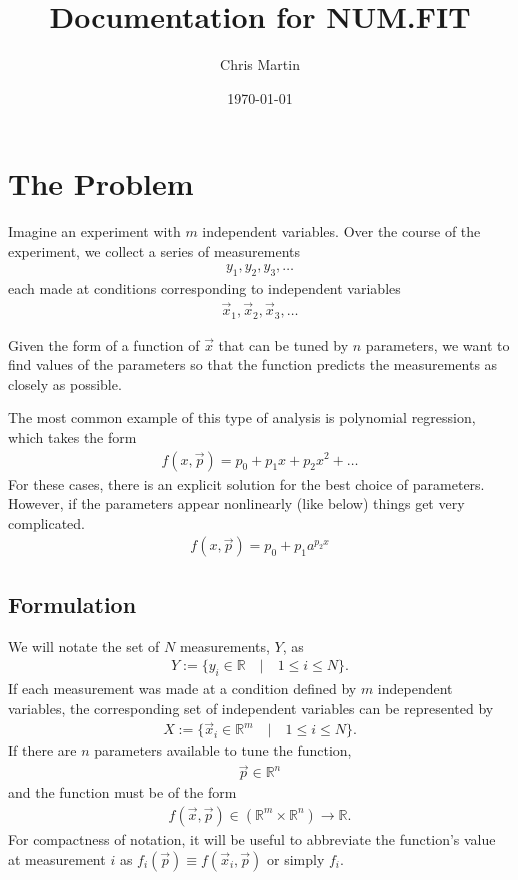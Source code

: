 \documentclass{article}
\title{Documentation for NUM.FIT}
\author{Chris Martin}
\date{\today}
\def\x{\vec{x}}
\def\p{\vec{p}}
\def\R{\mathbb{R}}
\begin{document}
\maketitle

\section{The Problem}
Imagine an experiment with $m$ independent variables.  Over the course of the experiment, we collect a series of measurements
\begin{align}
y_1, y_2, y_3, \ldots\nonumber
\end{align}
each made at conditions corresponding to independent variables
\begin{align}
\x_1, \x_2, \x_3, \ldots\nonumber
\end{align}

Given the form of a function of $\x$ that can be tuned by $n$ parameters, we want to find values of the parameters so that the function predicts the measurements as closely as possible.

The most common example of this type of analysis is polynomial regression, which takes the form
\begin{align}
f(x,\p) = p_0 + p_1 x + p_2 x^2 + \ldots \nonumber
\end{align}
For these cases, there is an explicit solution for the best choice of parameters.  However, if the parameters appear nonlinearly (like below) things get very complicated.
\begin{align}
f(x,\p) = p_0 + p_1 a ^ {p_2 x} \nonumber
\end{align}

\subsection{Formulation}
We will notate the set of $N$ measurements, $Y$, as
\begin{align}
Y:=\{y_i \in \R \quad | \quad 1 \le i \le N\}.
\end{align}
If each measurement was made at a condition defined by $m$ independent variables, the corresponding set of independent variables can be represented by
\begin{align}
X := \{\x_i \in \R^m \quad | \quad 1 \le i \le N\}.
\end{align}
If there are $n$ parameters available to tune the function,
\begin{align}
\p \in \R^n
\end{align}
and the function must be of the form
\begin{align}
f(\x,\p) \in (\R^m\times\R^n) \rightarrow \R.
\end{align}
For compactness of notation, it will be useful to abbreviate the function's value at measurement $i$ as $f_i(\p) \equiv f(\x_i,\p)$ or simply $f_i$.
\end{document}
